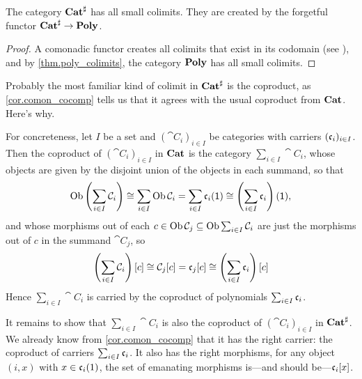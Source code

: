 \documentclass[Book-Poly]{subfiles}
\begin{document}
\begin{corollary} \label{cor.comon_cocomp}
The category $\mathbf{Cat}^\sharp$ has all small colimits.
They are created by the forgetful functor $\mathbf{Cat}^\sharp\to\mathbf{Poly}$.
\end{corollary}
\begin{proof}
A comonadic functor creates all colimits that exist in its codomain (see \cite{nlab:created-limit}), and by \cref{thm.poly_colimits}, the category $\mathbf{Poly}$ has all small colimits.
\end{proof}

\begin{example} \label{ex.comon_coprod}
Probably the most familiar kind of colimit in $\mathbf{Cat}^\sharp$ is the coproduct, as \cref{cor.comon_cocomp} tells us that it agrees with the usual coproduct from $\mathbf{Cat}$.
Here's why.

For concreteness, let $I$ be a set and $(\cat{C}_i)_{i\in I}$ be categories with carriers $(\mathfrak{c}_i)_{i\in I}$.
Then the coproduct of $(\cat{C}_i)_{i\in I}$ in $\mathbf{Cat}$ is the category $\sum_{i\in I}\cat{C}_i$, whose objects are given by the disjoint union of the objects in each summand, so that
\[
    \operatorname{Ob}\left(\sum_{i\in I}\mathcal{C}_i\right)\cong\sum_{i\in I}\operatorname{Ob}\mathcal{C}_i=\sum_{i\in I}\mathfrak{c}_i(\textsf{1})\cong\left(\sum_{i\in I}\mathfrak{c}_i\right)(\textsf{1}),
\]
and whose morphisms out of each $c\in\operatorname{Ob}\mathcal{C}_j\subseteq\operatorname{Ob}\sum_{i\in I}\mathcal{C}_i$ are just the morphisms out of $c$ in the summand $\cat{C}_j$, so
\[
    \left(\sum_{i\in I}\mathcal{C}_i\right)[c]\cong\mathcal{C}_j[c]=\mathfrak{c}_j[c]\cong\left(\sum_{i\in I}\mathfrak{c}_i\right)[c]
\]
Hence $\sum_{i\in I}\cat{C}_i$ is carried by the coproduct of polynomials $\sum_{i\in I}\mathfrak{c}_i$.

It remains to show that $\sum_{i\in I}\cat{C}_i$ is also the coproduct of $(\cat{C}_i)_{i\in I}$ in $\mathbf{Cat}^\sharp$.
We already know from \cref{cor.comon_cocomp} that it has the right carrier: the coproduct of carriers $\sum_{i\in I}\mathfrak{c}_i$. It also has the right morphisms, for any object $(i,x)$ with $x\in\mathfrak{c}_i(1)$, the set of emanating morphisms is---and should be---$\mathfrak{c}_i[x]$.





\end{example}
\end{document}
